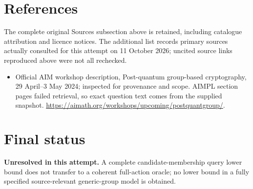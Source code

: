 \documentclass[11pt]{article}
\begin{document}
\section{References}
The complete original Sources subsection above is retained, including catalogue attribution and licence notices. The additional list records primary sources actually consulted for this attempt on 11 October 2026; uncited source links reproduced above were not all rechecked.
\begin{itemize}
\item Official AIM workshop description, Post-quantum group-based cryptography, 29 April--3 May 2024; inspected for provenance and scope. AIMPL section pages failed retrieval, so exact question text comes from the supplied snapshot. \url{https://aimath.org/workshops/upcoming/postquantgroup/}.
\end{itemize}
\section{Final status}
\textbf{Unresolved in this attempt.} A complete candidate-membership query lower bound does not transfer to a coherent full-action oracle; no lower bound in a fully specified source-relevant generic-group model is obtained.
\end{document}
